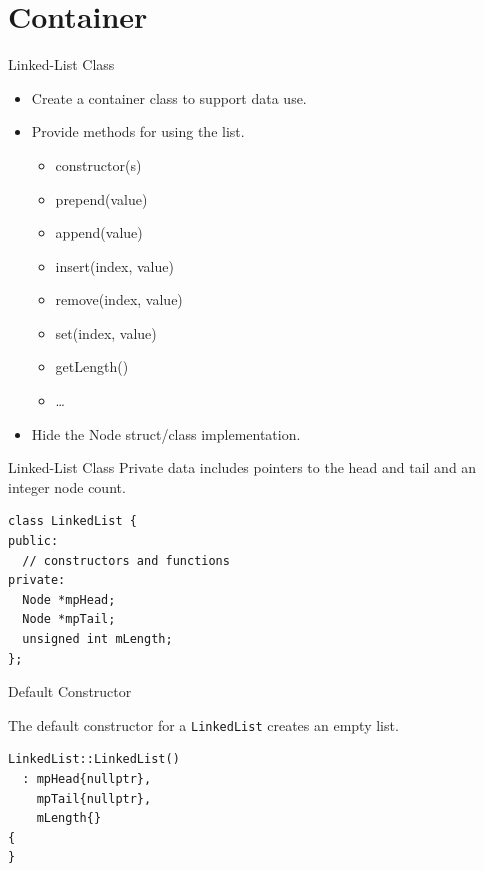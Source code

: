 \documentclass[14pt,aspectratio=1610, hyperref={pdfpagelayout=SinglePage}]{beamer}
\begin{document}
\section{Container}

\begin{frame}{Linked-List Class}

\begin{itemize}
\item
  Create a container class to support data use.
\item
  Provide methods for using the list.
  \begin{itemize}
  \item
    constructor(s)
  \item
    {prepend(value)}
  \item
    {append(value)}
  \item
    {insert(index, value)}
  \item
    {remove(index, value)}
  \item
    {set(index, value)}
  \item
    {getLength()}
  \item
    \ldots{}
  \end{itemize}
\item
  Hide the Node struct/class implementation.
\end{itemize}
\end{frame}

\begin{frame}[fragile]{Linked-List Class}
Private data includes pointers to the head and tail and an integer
node count.
\begin{lstlisting}
class LinkedList {
public:
  // constructors and functions
private:
  Node *mpHead;
  Node *mpTail;
  unsigned int mLength;
};
\end{lstlisting}
\end{frame}

\begin{frame}[fragile]{Default Constructor}

The default constructor for a \lstinline{LinkedList} creates an empty list.

\begin{lstlisting}
LinkedList::LinkedList()
  : mpHead{nullptr},
    mpTail{nullptr},
    mLength{}
{
}
\end{lstlisting}
\end{frame}
\end{document}
